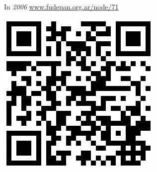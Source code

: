 \documentclass[portrait,final,a0paper,fontscale=0.277]{baposter}
\begin{document}
\begin{poster}
{{\begin{thebibliography}{1}
\begin{minipage}{\linewidth}
\begin{minipage}{0.87\linewidth}
           In {\em 2006} \url{www.fudepan.org.ar/node/71}
		\end{minipage}\hfill%
		\begin{minipage}{0.12\linewidth}
		\begin{center}
			\hfill\includegraphics[width=0.75\linewidth]{junin_qrcode}
		\end{center}
		\end{minipage}
		\end{minipage}
      \end{thebibliography}
    }
  }

\end{poster}
\end{document}
